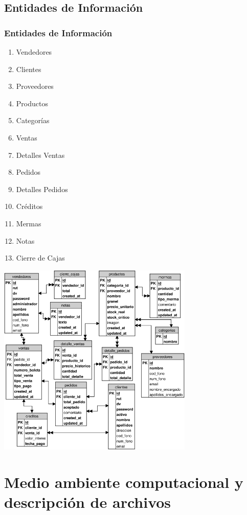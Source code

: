 \documentclass{beamer}
\begin{document}
\subsection{Entidades de Información}

\begin{frame}
\frametitle{Entidades de Información}
\begin{enumerate}
\item Vendedores
\item Clientes
\item Proveedores
\item Productos
\item Categorías
\item Ventas
\item Detalles Ventas
\item Pedidos
\item Detalles Pedidos
\item Créditos
\item Mermas
\item Notas
\item Cierre de Cajas
\end{enumerate}
\end{frame}

\begin{frame}
\begin{center}
\includegraphics[width=0.7\textwidth]{images/modelo_relacional.png}
\end{center}
\end{frame}

\section{Medio ambiente computacional y descripción de archivos}
\end{document}
